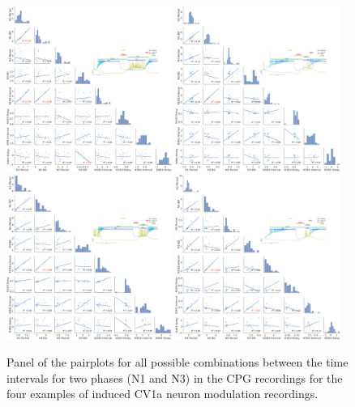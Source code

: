 \begin{figure}[htbp]
	\centering
	\includegraphics[width=0.48\textwidth]{./img/invariants/data/SUSSEX/CV1a_driven1/images/2phases/panel_with_pairplot.png}
	\includegraphics[width=0.48\textwidth]{./img/invariants/data/SUSSEX/CV1a_driven2/images/panel_with_pairplot.png}
	\includegraphics[width=0.48\textwidth]{./img/invariants/data/SUSSEX/CV1a_driven4/images/2phases/panel_with_pairplot.png}
	\includegraphics[width=0.48\textwidth]{./img/invariants/data/SUSSEX/CV1a_driven3/images/panel_with_pairplot.png}
	\caption{Panel of the pairplots for all possible combinations between the time intervals for two phases (N1 and N3) in the CPG recordings for the four examples of induced CV1a neuron modulation recordings.}
	\label{fig:cv1a pairplot comparison}
\end{figure}


